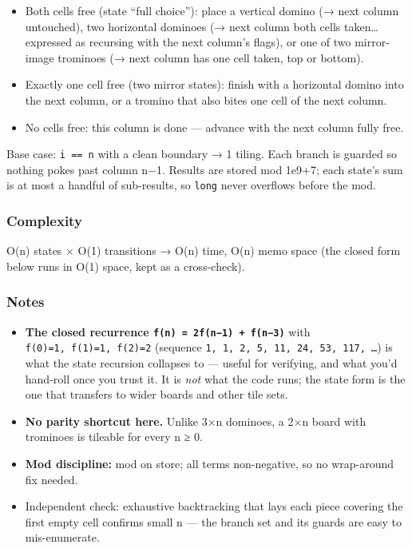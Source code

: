 \documentclass[
  10pt,
  letterpaper,
  onecolumn]{article}
\providecommand{\tightlist}{%
  \setlength{\itemsep}{0pt}\setlength{\parskip}{0pt}}
\begin{document}
\begin{itemize}
\tightlist
\item
  Both cells free (state ``full choice''): place a vertical domino (→
  next column untouched), two horizontal dominoes (→ next column both
  cells taken\ldots{} expressed as recursing with the next column's
  flags), or one of two mirror-image trominoes (→ next column has one
  cell taken, top or bottom).
\item
  Exactly one cell free (two mirror states): finish with a horizontal
  domino into the next column, or a tromino that also bites one cell of
  the next column.
\item
  No cells free: this column is done --- advance with the next column
  fully free.
\end{itemize}

Base case: \texttt{i\ ==\ n} with a clean boundary → 1 tiling. Each
branch is guarded so nothing pokes past column n−1. Results are stored
mod 1e9+7; each state's sum is at most a handful of sub-results, so
\texttt{long} never overflows before the mod.

\hypertarget{complexity-11}{%
\subsubsection{Complexity}\label{complexity-11}}

O(n) states × O(1) transitions → O(n) time, O(n) memo space (the closed
form below runs in O(1) space, kept as a cross-check).

\hypertarget{notes-9}{%
\subsubsection{Notes}\label{notes-9}}

\begin{itemize}
\tightlist
\item
  \textbf{The closed recurrence \texttt{f(n)\ =\ 2f(n−1)\ +\ f(n−3)}}
  with \texttt{f(0)=1,\ f(1)=1,\ f(2)=2} (sequence
  \texttt{1,\ 1,\ 2,\ 5,\ 11,\ 24,\ 53,\ 117,\ …}) is what the state
  recursion collapses to --- useful for verifying, and what you'd
  hand-roll once you trust it. It is \emph{not} what the code runs; the
  state form is the one that transfers to wider boards and other tile
  sets.
\item
  \textbf{No parity shortcut here.} Unlike 3×n dominoes, a 2×n board
  with trominoes is tileable for every n ≥ 0.
\item
  \textbf{Mod discipline:} mod on store; all terms non-negative, so no
  wrap-around fix needed.
\item
  Independent check: exhaustive backtracking that lays each piece
  covering the first empty cell confirms small n --- the branch set and
  its guards are easy to mis-enumerate.
\end{itemize}
\end{document}
